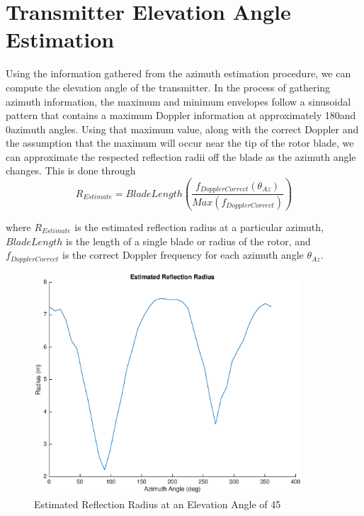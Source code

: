 \section{Transmitter Elevation Angle Estimation} \label{sec:transmitter_elevation_angle_estimation}
Using the information gathered from the azimuth estimation procedure, we can compute the elevation angle of the transmitter. In the process of gathering azimuth information, the maximum and minimum envelopes follow a sinusoidal pattern that contains a maximum Doppler information at approximately 180\textdegree \space and 0\textdegree \space azimuth angles. Using that maximum value, along with the correct Doppler and the assumption that the maximum will occur near the tip of the rotor blade, we can approximate the respected reflection radii off the blade as the azimuth angle changes. This is done through 
\begin{equation}
	R_{Estimate} = BladeLength \left(\frac{f_{DopplerCorrect}(\theta_{Az})}{Max(f_{DopplerCorrect})}\right)
	\label{eqn:r_estimate}
\end{equation}

where $R_{Estimate}$ is the estimated reflection radius at a particular azimuth, $BladeLength$ is the length of a single blade or radius of the rotor, and $f_{DopplerCorrect}$ is the correct Doppler frequency for each azimuth angle $\theta_{Az}$.

\begin{figure}
	\begin{center}
		\includegraphics[width=10cm]{images/results/Estimated_reflection_radius_Azimuth_range.eps}
		\caption{Estimated Reflection Radius at an Elevation Angle of 45\textdegree}
		\label{fig:est_radius_azimuth_range}
	\end{center}
\end{figure}

